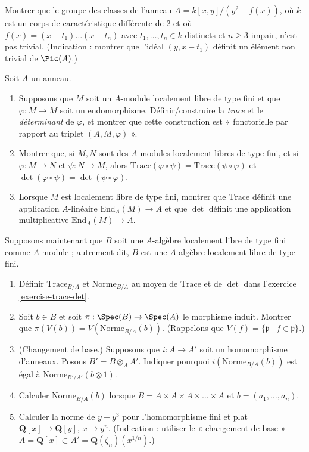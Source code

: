 \begin{exercise}
\label{exercise-class-group-not-trivial}
Montrer que le groupe des classes de l'anneau
$A = k[x, y]/(y^2 - f(x))$, où $k$ est un corps de caractéristique différente de $2$
et où $f(x) = (x - t_1) \ldots (x - t_n)$ avec $t_1, \ldots, t_n \in k$
distincts et $n \geq 3$ impair, n'est pas trivial. (Indication : montrer que
l'idéal $(y, x - t_1)$ définit un élément non trivial de $\Pic(A)$.)
\end{exercise}

\begin{exercise}
\label{exercise-trace-det}
Soit $A$ un anneau.
\begin{enumerate}
\item Supposons que $M$ soit un $A$-module localement libre de type fini et
que $\varphi : M \to M$ soit un endomorphisme. Définir/construire
la {\it trace} et le {\it déterminant} de $\varphi$, et montrer que cette
construction est « fonctorielle par rapport au triplet $(A, M, \varphi)$ ».
\item Montrer que, si $M, N$ sont des $A$-modules localement libres de type fini,
et si $\varphi : M \to N$ et $\psi : N \to M$, alors
$\text{Trace}(\varphi \circ \psi) = \text{Trace}(\psi \circ \varphi)$ et
$\det(\varphi \circ \psi) = \det(\psi \circ \varphi)$.
\item Lorsque $M$ est localement libre de type fini, montrer que
$\text{Trace}$ définit une application $A$-linéaire $\text{End}_A(M) \to A$ et que
$\det$ définit une application multiplicative $\text{End}_A(M) \to A$.
\end{enumerate}
\end{exercise}

\begin{exercise}
\label{exercise-trace-det-rings}
Supposons maintenant que $B$ soit une $A$-algèbre localement libre
de type fini comme $A$-module ; autrement dit, $B$ est une $A$-algèbre
localement libre de type fini.
\begin{enumerate}
\item Définir $\text{Trace}_{B/A}$ et $\text{Norme}_{B/A}$ au moyen de
$\text{Trace}$ et de $\det$ dans l'exercice \ref{exercise-trace-det}.
\item Soit $b\in B$ et soit $\pi : \Spec(B) \to \Spec(A)$
le morphisme induit. Montrer que $\pi(V(b)) = V(\text{Norme}_{B/A}(b))$.
(Rappelons que $V(f) = \{ {\mathfrak p} \mid f \in {\mathfrak p}\}$.)
\item (Changement de base.) Supposons que $i : A \to A'$ soit un homomorphisme d'anneaux. Posons
$B' = B \otimes_A A'$. Indiquer pourquoi $i(\text{Norme}_{B/A}(b))$ est égal à
$\text{Norme}_{B'/A'}(b \otimes 1)$.
\item Calculer $\text{Norme}_{B/A}(b)$ lorsque
$B = A \times A \times A \times \ldots \times A$
et $b = (a_1, \ldots, a_n)$.
\item Calculer la norme de $y-y^3$ pour l'homomorphisme fini et plat
${\mathbf Q}[x] \to {\mathbf Q}[y]$, $x \to y^n$. (Indication : utiliser
le « changement de base »
$A = {\mathbf Q}[x] \subset A' = {\mathbf Q}(\zeta_n)(x^{1/n})$.)
\end{enumerate}
\end{exercise}



